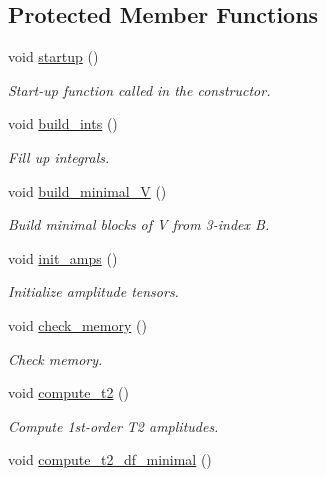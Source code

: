 \subsection*{Protected Member Functions}
\begin{DoxyCompactItemize}
\item 
void \mbox{\hyperlink{classforte_1_1_s_a___m_r_p_t2_a9ada26865f0d7ee12f277e6ceea12b6b}{startup}} ()
\begin{DoxyCompactList}\small\item\em Start-\/up function called in the constructor. \end{DoxyCompactList}\item 
void \mbox{\hyperlink{classforte_1_1_s_a___m_r_p_t2_a901e36603b40dad78913fc3b7079f23a}{build\+\_\+ints}} ()
\begin{DoxyCompactList}\small\item\em Fill up integrals. \end{DoxyCompactList}\item 
void \mbox{\hyperlink{classforte_1_1_s_a___m_r_p_t2_a7efd7c05e4c8771ce232d2e0929173af}{build\+\_\+minimal\+\_\+V}} ()
\begin{DoxyCompactList}\small\item\em Build minimal blocks of V from 3-\/index B. \end{DoxyCompactList}\item 
void \mbox{\hyperlink{classforte_1_1_s_a___m_r_p_t2_a2e566cf0e0e0f3337ce78d94b2acf011}{init\+\_\+amps}} ()
\begin{DoxyCompactList}\small\item\em Initialize amplitude tensors. \end{DoxyCompactList}\item 
void \mbox{\hyperlink{classforte_1_1_s_a___m_r_p_t2_afd536054c75f83ca5f33ec81f85f2e7f}{check\+\_\+memory}} ()
\begin{DoxyCompactList}\small\item\em Check memory. \end{DoxyCompactList}\item 
void \mbox{\hyperlink{classforte_1_1_s_a___m_r_p_t2_a483a994948cb525c0d524a16599df962}{compute\+\_\+t2}} ()
\begin{DoxyCompactList}\small\item\em Compute 1st-\/order T2 amplitudes. \end{DoxyCompactList}\item 
void \mbox{\hyperlink{classforte_1_1_s_a___m_r_p_t2_ab325a9658616f40f8f8326a9ed4cd18d}{compute\+\_\+t2\+\_\+df\+\_\+minimal}} ()

\end{DoxyCompactItemize}
